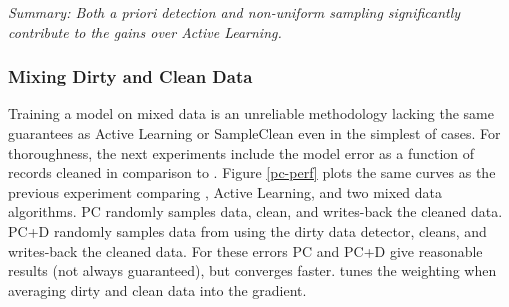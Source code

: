 \vspace{0.25em}

\noindent \emph{Summary: Both a priori detection and non-uniform sampling significantly contribute to the gains over Active Learning.}

\subsubsection{Mixing Dirty and Clean Data}
Training a model on mixed data is an unreliable methodology lacking the same guarantees as Active Learning or SampleClean even in the simplest of cases.
For thoroughness, the next experiments include the model error as a function of records cleaned in comparison to \sys.
Figure \ref{pc-perf} plots the same curves as the previous experiment comparing \sys, Active Learning, and two mixed data algorithms.
PC randomly samples data, clean, and writes-back the cleaned data.
PC+D randomly samples data from using the dirty data detector, cleans, and writes-back the cleaned data.
For these errors PC and PC+D give reasonable results (not always guaranteed), but \sys converges faster.
\sys tunes the weighting when averaging dirty and clean data into the gradient.

